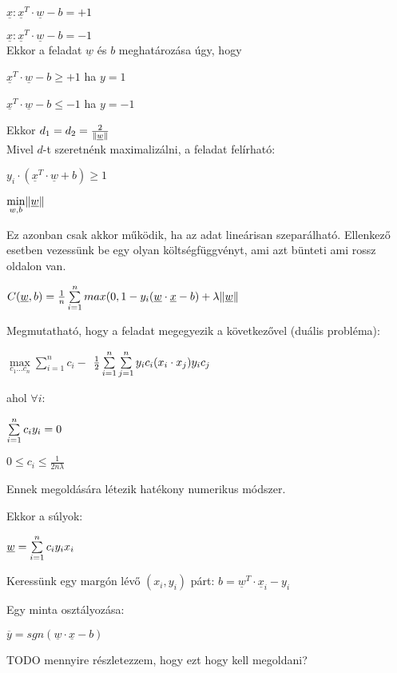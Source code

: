 $ \underline{x}: \underline{x}^T \cdot \underline{w} - b = +1 $

$ \underline{x}: \underline{x}^T \cdot \underline{w} - b = -1 $
\\
Ekkor a feladat $ \underline{w} $ és $ b $ meghatározása úgy, hogy 

$ \underline{x}^T \cdot \underline{w} - b \geq +1 $ ha $  y=1 $

$ \underline{x}^T \cdot \underline{w} - b \leq -1 $ ha $  y=-1 $

Ekkor $ d_1 = d_2 = \frac{2}{\lVert\underline{w}\rVert} $  
\\
Mivel $ d $-t szeretnénk maximalizálni, a feladat felírható:

$ y_i \cdot (\underline{x}^T \cdot \underline{w} + b) \geq 1 $

$ \min\limits_{w, b} \lVert\underline{w}\rVert $

Ez azonban csak akkor működik, ha az adat lineárisan szeparálható. Ellenkező esetben
vezessünk be egy olyan költségfüggvényt, ami azt bünteti ami rossz oldalon van.

$ C(\underline{w},b)  = \frac{1}{n} \sum\limits_{i=1}^{n} 
max(0, 1 - y_i(\underline{w} \cdot \underline{x} - b) + \lambda \lVert\underline{w}\rVert $



\noindent
Megmutatható, hogy a feladat megegyezik a következővel (duális probléma): 

$ \max\limits_{c_1 \dots c_n} \sum\limits_{i=1}^{n}c_i -  $
$ \frac{1}{2}\sum\limits_{{i}=1}^{n}\sum\limits_{{j}=1}^{n} y_i c_i (x_i \cdot x_j) y_i c_j $

\noindent
ahol $ \forall i: $

$  \sum\limits_{{i}=1}^{n} c_i y_i = 0 $

$ 0 \leq c_i \leq \frac{1}{2n\lambda} $

\noindent
Ennek megoldására létezik hatékony numerikus módszer.

\noindent
Ekkor a súlyok:

$ \underline{w} = \sum\limits_{{i}=1}^{n} c_i y_i x_i $

\noindent
Keressünk egy margón lévő $ (x_i, y_i) $ párt:
$ b = \underline{w}^T \cdot \underline{x}_i  - y_i$

\noindent
Egy minta osztályozása:

$ \overline{y} = sgn(\underline{w} \cdot \underline{x} - b) $

\noindent
TODO mennyire részletezzem, hogy ezt hogy kell megoldani?




